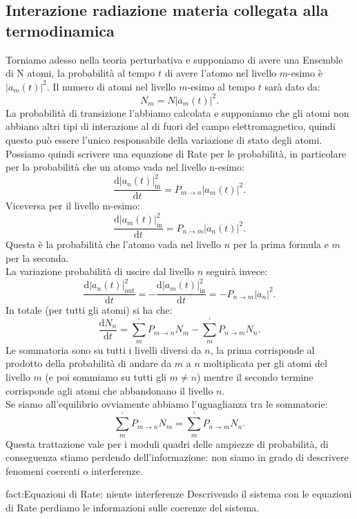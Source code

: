 \subsection{Interazione radiazione materia collegata alla termodinamica}%
Torniamo adesso nella teoria perturbativa e supponiamo di avere una Ensemble di N atomi, la probabilità al tempo $t$  di avere l'atomo nel livello $m$-esimo è $\left|a_m(t) \right|^2$. Il numero di atomi nel livello $m$-esimo al tempo $t$  sarà dato da:
\[
    N_m = N\left|a_m(t) \right|^2
.\] 
La probabilità di transizione l'abbiamo calcolata e supponiamo che gli atomi non abbiano altri tipi di interazione al di fuori del campo elettromagnetico, quindi questo può essere l'unico responsabile della variazione di stato degli atomi. Possiamo quindi scrivere una equazione di Rate per le probabilità, in particolare per la probabilità che un atomo vada nel livello n-esimo:
\[
    \frac{\text{d} \left|a_n(t) \right|^2_\text{in} }{\text{d} t} =
    P_{m\to n}\left|a_m(t) \right|^2
.\] 
Viceversa per il livello m-esimo:
\[
    \frac{\text{d} \left|a_m(t) \right|^2_\text{in} }{\text{d} t} =
    P_{n\to m}\left|a_n(t) \right|^2
.\] 
Questa è la probabilità che l'atomo vada nel livello $n$  per la prima formula e $m$  per la seconda.\\
La variazione probabilità di uscire dal livello $n$ seguirà invece:
\[
    \frac{\text{d} \left|a_n(t)\right|^2_\text{out} }{\text{d} t} =
    -\frac{\text{d} \left|a_m(t) \right|^2_\text{in} }{\text{d} t}=
    -P_{n\to m}\left|a_n\right|^2
.\] 
In totale (per tutti gli atomi) si ha che:
\[
\frac{\text{d} N_n}{\text{d} t} = \sum_{m}^{'} P_{m\to n}N_m 
-\sum_{m}^{'} P_{n\to m}N_n
.\] 
Le sommatoria sono su tutti i livelli diversi da $n$, la prima corrisponde al prodotto della probabilità di andare da $m$  a $n$  moltiplicata per gli atomi del livello $m$  (e poi sommiamo su tutti gli $m\neq n$) mentre il secondo termine corrisponde agli atomi che abbandonano il livello $n$.\\
Se siamo all'equilibrio ovviamente abbiamo l'uguaglianza tra le sommatorie:
\[
\sum_{m}^{'} P_{m\to n}N_m =
\sum_{m}^{'} P_{n\to m}N_{n} \label{eq:parentebilancio}
.\] 
Questa trattazione vale per i moduli quadri delle ampiezze di probabilità, di conseguenza stiamo perdendo dell'informazione: non siamo in grado di descrivere fenomeni coerenti o interferenze. 
\begin{fact}{fact:Equazioni di Rate: niente interferenze}
Descrivendo il sistema con le equazioni di Rate perdiamo le informazioni sulle coerenze del sistema.
\end{fact}
